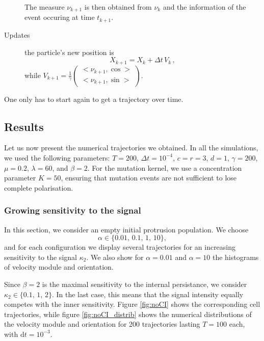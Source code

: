 \documentclass[a4paper,11pt]{article}
\newcommand{\dx}{\textrm{d}}
\begin{document}
\begin{description}
\begin{itemize}
\end{itemize} 
The measure $\nu_{k+1}$ is then obtained from $\nu_k$ and the information of the event occuring at time $t_{k+1}$.
\item[Updates] the particle's new position is 
\begin{displaymath}
X_{k+1} = X_k + \Delta t \, V_k\,,
\end{displaymath}
while $V_{k+1}= \frac{1}{\gamma} \begin{pmatrix}
<\nu_{k+1},\cos>\\<\nu_{k+1},\sin>
\end{pmatrix}$.
\end{description}

One only has to start again to get a trajectory over time. 

\subsection{Results}
Let us now present the numerical trajectories we obtained. In all the simulations, we used the following parameters: $T=200$, $\Delta t=10^{-4}$, $c=r=3$, $d=1$, $\gamma=200$, $\mu=0.2$, $\lambda=60$, and $\beta=2$. For the mutation kernel, we use a concentration parameter $K=50$, ensuring that mutation events are not sufficient to lose complete polarisation.\par 


\subsubsection{Growing sensitivity to the signal}
In this section, we consider an empty initial protrusion population. We choose $$\alpha\in \{ 0.01,\, 0.1,\, 1,\,10\},$$ and for each configuration we display several trajectories for an increasing sensitivity to the signal $\kappa_2$. 
We also show for $\alpha=0.01$ and $\alpha=10$ the histograms of velocity module and orientation. 


Since $\beta=2$ is the maximal sensitivity to the internal persistance, we consider $\kappa_2\in \{0.1,\,1,\,2\}$. In the last case, this means that the signal intensity equally competes with the inner sensitivity. Figure \ref{fig:noCI} shows the corresponding cell trajectories, while figure \ref{fig:noCI_distrib} shows the numerical distributions of the velocity module and orientation for 200 trajectories lasting $T=100$ each, with $\dx t = 10^{-3}$.

\end{document}
